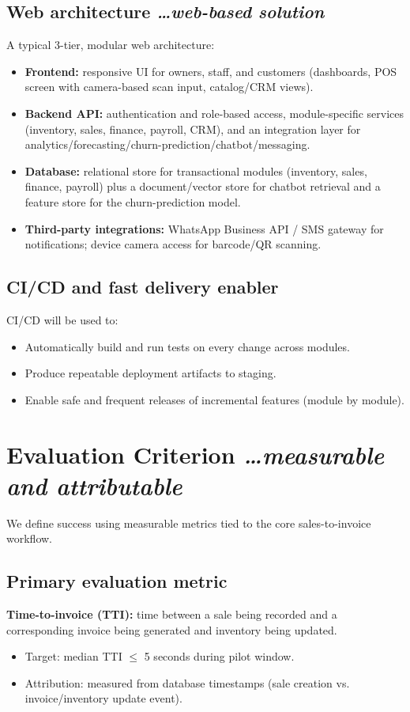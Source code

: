\documentclass[11pt,a4paper]{article}
\newcommand{\BvrHint}[1]{%
  {\normalfont\normalsize\itshape\hfill #1}}
\begin{document}
\subsection{Web architecture %
\BvrHint{\ldots web-based solution}}
A typical 3-tier, modular web architecture:
\begin{itemize}[leftmargin=0.7cm]
    \item \textbf{Frontend:} responsive UI for owners, staff, and customers (dashboards, POS screen with camera-based scan input, catalog/CRM views).
    \item \textbf{Backend API:} authentication and role-based access, module-specific services (inventory, sales, finance, payroll, CRM), and an integration layer for analytics/forecasting/churn-prediction/chatbot/messaging.
    \item \textbf{Database:} relational store for transactional modules (inventory, sales, finance, payroll) plus a document/vector store for chatbot retrieval and a feature store for the churn-prediction model.
    \item \textbf{Third-party integrations:} WhatsApp Business API / SMS gateway for notifications; device camera access for barcode/QR scanning.
\end{itemize}

\subsection{CI/CD and fast delivery enabler}
CI/CD will be used to:
\begin{itemize}[leftmargin=0.7cm]
    \item Automatically build and run tests on every change across modules.
    \item Produce repeatable deployment artifacts to staging.
    \item Enable safe and frequent releases of incremental features (module by module).
\end{itemize}

\section{Evaluation Criterion %
\BvrHint{\ldots measurable and attributable}}
We define success using measurable metrics tied to the core sales-to-invoice workflow.

\subsection{Primary evaluation metric}
\textbf{Time-to-invoice (TTI):} time between a sale being recorded and a corresponding invoice being generated and inventory being updated.
\begin{itemize}[leftmargin=0.7cm]
    \item Target: median TTI $\le$ 5 seconds during pilot window.
    \item Attribution: measured from database timestamps (sale creation vs. invoice/inventory update event).
\end{itemize}
\end{document}
